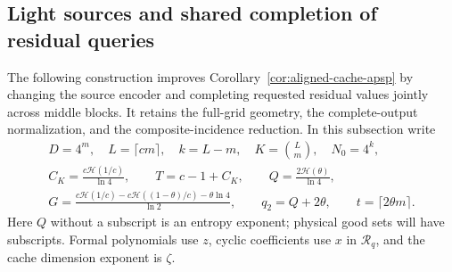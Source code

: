 \documentclass[11pt]{article}
\newcommand{\HH}{\mathcal H}
\begin{document}

\subsection*{Light sources and shared completion of residual queries}
\label{sec:light-source}

The following construction improves Corollary~\ref{cor:aligned-cache-apsp}
by changing the source encoder and completing requested residual values
jointly across middle blocks. It retains the full-grid geometry, the
complete-output normalization, and the composite-incidence reduction.
In this subsection write
\[
 \begin{gathered}
 D=4^m,\quad L=\lceil cm\rceil,\quad k=L-m,\quad
 K=\binom Lm,\quad N_0=4^k,\\
 C_K=\frac{c\HH(1/c)}{\ln4},\qquad T=c-1+C_K,\qquad
 Q=\frac{2\HH(\theta)}{\ln4},\\
 G=\frac{c\HH(1/c)-c\HH((1-\theta)/c)-\theta\ln4}{\ln2},
 \qquad q_2=Q+2\theta,\qquad t=\lceil2\theta m\rceil .
 \end{gathered}
\]
Here $Q$ without a subscript is an entropy exponent; physical good sets
will have subscripts. Formal polynomials use $z$, cyclic coefficients
use $x$ in $\mathcal R_q$, and the cache dimension exponent is $\zeta$.
\end{document}
